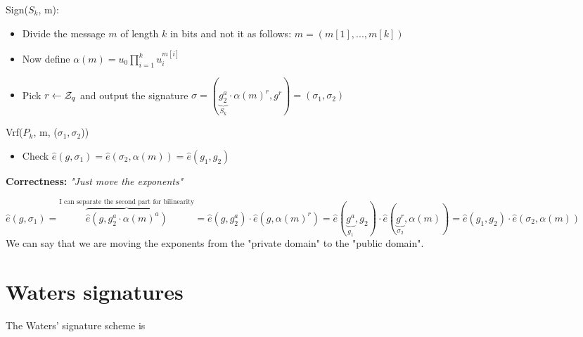 Sign($S_k$, m):
\begin{itemize}
    \item Divide the message $m$ of length $k$ in bits and not it as follows: $m=(m[1],...,m[k])$
    \item Now define $\alpha(m)=u_0\prod_{i=1}^k u_i^{m[i]}$
    \item Pick $r\leftarrow \mathcal{Z}_q$ and output the signature $\sigma =(\underbrace{g_2^a}_{S_k} \cdot \alpha(m)^r,g^r)=(\sigma_1,\sigma_2)$
\end{itemize}

Vrf($P_k$, m, ($\sigma_1,\sigma_2$))
\begin{itemize}
    \item Check $\hat{e}(g,\sigma_1)=\hat{e}(\sigma_2,\alpha(m))=\hat{e}(g_1,g_2)$
\end{itemize}

\textbf{Correctness:} \textit{"Just move the exponents"} 

$\hat{e}(g,\sigma_1)=\overbrace{\hat{e}(g,g_2^a\cdot \alpha(m)^a)}^{\text{I can separate the second part for bilinearity}}=\hat{e}(g,g_2^a)\cdot \hat{e}(g,\alpha(m)^r)=\hat{e}(\underbrace{g^a}_{g_1},g_2)\cdot \hat{e}(\underbrace{g^r}_{\sigma_2},\alpha(m))=\hat{e}(g_1,g_2)\cdot\hat{e}(\sigma_2,\alpha(m))$\\
We can say that we are moving the exponents from the "private domain" to the "public domain".

\section{Waters signatures}
\begin{theorem}
    The Waters' signature scheme is \ufcma
\end{theorem}

